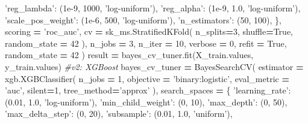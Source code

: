 \documentclass[]{book}
\newenvironment{Shaded}{\begin{snugshade}}{\end{snugshade}}
\newcommand{\CommentTok}[1]{\textcolor[rgb]{0.56,0.35,0.01}{\textit{#1}}}
\newcommand{\DecValTok}[1]{\textcolor[rgb]{0.00,0.00,0.81}{#1}}
\newcommand{\FloatTok}[1]{\textcolor[rgb]{0.00,0.00,0.81}{#1}}
\newcommand{\NormalTok}[1]{#1}
\newcommand{\OperatorTok}[1]{\textcolor[rgb]{0.81,0.36,0.00}{\textbf{#1}}}
\newcommand{\StringTok}[1]{\textcolor[rgb]{0.31,0.60,0.02}{#1}}
\newcommand{\VariableTok}[1]{\textcolor[rgb]{0.00,0.00,0.00}{#1}}
\begin{document}
\begin{Shaded}
\begin{Highlighting}[]
        \StringTok{'reg_lambda'}\NormalTok{: (}\FloatTok{1e-9}\NormalTok{, }\DecValTok{1000}\NormalTok{, }\StringTok{'log-uniform'}\NormalTok{),}
        \StringTok{'reg_alpha'}\NormalTok{: (}\FloatTok{1e-9}\NormalTok{, }\FloatTok{1.0}\NormalTok{, }\StringTok{'log-uniform'}\NormalTok{),}
        \StringTok{'scale_pos_weight'}\NormalTok{: (}\FloatTok{1e-6}\NormalTok{, }\DecValTok{500}\NormalTok{, }\StringTok{'log-uniform'}\NormalTok{),}
        \StringTok{'n_estimators'}\NormalTok{: (}\DecValTok{50}\NormalTok{, }\DecValTok{100}\NormalTok{),}
\NormalTok{    \},    }
\NormalTok{    scoring }\OperatorTok{=} \StringTok{'roc_auc'}\NormalTok{,}
\NormalTok{    cv }\OperatorTok{=}\NormalTok{ sk_ms.StratifiedKFold(}
\NormalTok{        n_splits}\OperatorTok{=}\DecValTok{3}\NormalTok{,}
\NormalTok{        shuffle}\OperatorTok{=}\VariableTok{True}\NormalTok{,}
\NormalTok{        random_state }\OperatorTok{=} \DecValTok{42}
\NormalTok{    ),}
\NormalTok{    n_jobs }\OperatorTok{=} \DecValTok{3}\NormalTok{,}
\NormalTok{    n_iter }\OperatorTok{=} \DecValTok{10}\NormalTok{,   }
\NormalTok{    verbose }\OperatorTok{=} \DecValTok{0}\NormalTok{,}
\NormalTok{    refit }\OperatorTok{=} \VariableTok{True}\NormalTok{,}
\NormalTok{    random_state }\OperatorTok{=} \DecValTok{42}
\NormalTok{)}
\NormalTok{result }\OperatorTok{=}\NormalTok{ bayes_cv_tuner.fit(X_train.values, y_train.values)}
\CommentTok{#v2: XGBoost}
\NormalTok{bayes_cv_tuner }\OperatorTok{=}\NormalTok{ BayesSearchCV(}
\NormalTok{    estimator }\OperatorTok{=}\NormalTok{ xgb.XGBClassifier(}
\NormalTok{        n_jobs }\OperatorTok{=} \DecValTok{1}\NormalTok{,}
\NormalTok{        objective }\OperatorTok{=} \StringTok{'binary:logistic'}\NormalTok{,}
\NormalTok{        eval_metric }\OperatorTok{=} \StringTok{'auc'}\NormalTok{,}
\NormalTok{        silent}\OperatorTok{=}\DecValTok{1}\NormalTok{,}
\NormalTok{        tree_method}\OperatorTok{=}\StringTok{'approx'}
\NormalTok{    ),}
\NormalTok{    search_spaces }\OperatorTok{=}\NormalTok{ \{}
        \StringTok{'learning_rate'}\NormalTok{: (}\FloatTok{0.01}\NormalTok{, }\FloatTok{1.0}\NormalTok{, }\StringTok{'log-uniform'}\NormalTok{),}
        \StringTok{'min_child_weight'}\NormalTok{: (}\DecValTok{0}\NormalTok{, }\DecValTok{10}\NormalTok{),}
        \StringTok{'max_depth'}\NormalTok{: (}\DecValTok{0}\NormalTok{, }\DecValTok{50}\NormalTok{),}
        \StringTok{'max_delta_step'}\NormalTok{: (}\DecValTok{0}\NormalTok{, }\DecValTok{20}\NormalTok{),}
        \StringTok{'subsample'}\NormalTok{: (}\FloatTok{0.01}\NormalTok{, }\FloatTok{1.0}\NormalTok{, }\StringTok{'uniform'}\NormalTok{),}

\end{Highlighting}
\end{Shaded}
\end{document}
